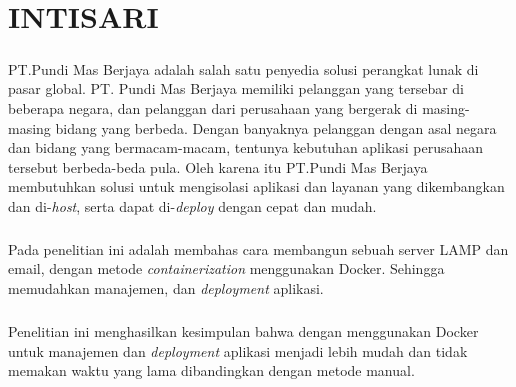 \documentclass[../../SKRIPSI_ALDZIKRI_DWIJAYANTO_PRATHAMA.tex]{subfiles}
\begin{document}
\chapter*{INTISARI}\vspace*{2ex}
\paragraph*{}PT.Pundi Mas Berjaya adalah salah satu penyedia
solusi perangkat lunak di pasar global. PT. Pundi Mas
Berjaya memiliki pelanggan yang tersebar di beberapa negara,
dan pelanggan dari perusahaan yang bergerak di masing-masing
bidang yang berbeda. Dengan banyaknya pelanggan dengan asal
negara dan bidang yang bermacam-macam, tentunya
kebutuhan aplikasi perusahaan tersebut berbeda-beda pula.
Oleh karena itu PT.Pundi Mas Berjaya membutuhkan solusi untuk mengisolasi
aplikasi dan layanan yang dikembangkan dan di-\textit{host}, serta dapat di-\textit{deploy}
dengan cepat dan mudah.

\paragraph*{}Pada penelitian ini adalah membahas cara membangun
sebuah server LAMP dan email, dengan metode \textit{containerization} menggunakan Docker.
Sehingga memudahkan manajemen, dan \textit{deployment}
aplikasi.

\paragraph*{}Penelitian ini menghasilkan kesimpulan bahwa
dengan menggunakan Docker untuk manajemen dan
\textit{deployment} aplikasi menjadi lebih mudah dan tidak
memakan waktu yang lama dibandingkan dengan metode manual.\\
\end{document}
